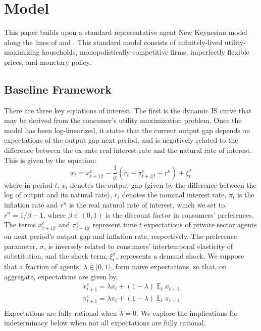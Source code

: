 \documentclass[english,authoryear,12pt]{elsarticle}
\DeclareMathOperator{\E}{\mathbb{E}}
\begin{document}
\section{\label{Model}Model}
This paper builds upon a standard representative agent New Keynesian model along the lines of \cite{clarida1999} and \cite{steinsson2003}. This standard model consists of infinitely-lived utility-maximizing households, monopolistically-competitive firms, imperfectly flexible prices, and monetary policy.

\subsection{Baseline Framework}
There are three key equations of interest. The first is the dynamic IS curve that may be derived from the consumer's utility maximization problem. Once the model has been log-linearized, it states that the current output gap depends on expectations of the output gap next period, and is negatively related to the difference between the ex-ante real interest rate and the natural rate of interest. This is given by the equation:
\begin{equation}\label{eq:ISe}
	x_t = x_{t+1|t}^e - \frac{1}{\sigma} \left( r_t - \pi_{t+1|t}^e  - r^n  \right) + \xi_t^{x}
\end{equation}
where in period $t$, $x_t$ denotes the output gap (given by the difference between the log of output and its natural rate), $r_t$ denotes the nominal interest rate, $\pi_t$ is the inflation rate and $r^n$ is the real natural rate of interest, which we set to, $r^n = 1/\beta - 1$, where $\beta \in (0,1)$ is the discount factor in consumers' preferences. The terms $x_{t+1|t}^e$ and $\pi_{t+1|t}^e$ represent time $t$ expectations of private sector agents on next period's output gap and inflation rate, respectively. The preference parameter, $\sigma$, is inversely related to consumers' intertemporal elasticity of substitution, and the shock term, $\xi_t^x$, represents a demand shock. We suppose that a fraction of agents, $\lambda\in[0,1)$, form na\"ive expectations, so that, on aggregate, expectations are given by,
\begin{equation}
	\begin{array}{c}
		x_{t+1}^e = \lambda x_t + (1-\lambda) \E_t x_{t+1} \\ [1.5pc]
		\pi_{t+1}^e = \lambda \pi_t + (1-\lambda) \E_t \pi_{t+1} \\
	\end{array}
\end{equation}
Expectations are fully rational when $\lambda=0$. We explore the implications for indeterminacy below when not all expectations are fully rational.
\end{document}

